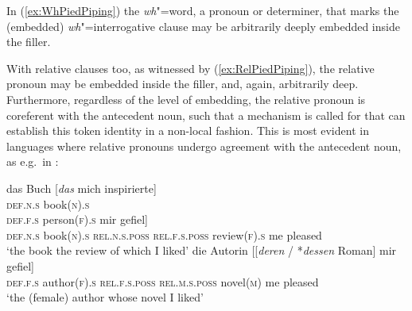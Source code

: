 \documentclass[output=paper
,notxmath 
	        ,collection
	        ,collectionchapter
 	        ,biblatex
                ,babelshorthands
                ,newtxmath
                ,draftmode
                ,colorlinks, citecolor=brown
]{langscibook}
\begin{document}
\begin{exe}
  \ex \label{ex:WhPiedPiping}
  \begin{xlist}
  \end{xlist}
\end{exe}

\begin{exe}
  \ex \label{ex:RelPiedPiping}
  \begin{xlist}
  \end{xlist}
\end{exe}

\noindent
In (\ref{ex:WhPiedPiping}) the \emph{wh}"=word, a pronoun or determiner, that
marks the (embedded) \emph{wh}"=interrogative clause may be arbitrarily deeply embedded inside the filler.  

With relative clauses too, as witnessed by (\ref{ex:RelPiedPiping}), the
relative pronoun may be embedded inside the filler, and, again,
arbitrarily deep. Furthermore, regardless of the level of embedding,
the relative pronoun is coreferent with the antecedent noun, such that
a mechanism is called for that can establish this token identity in a
non-local fashion. This is most evident in languages where relative
pronouns undergo agreement with the antecedent noun, as e.g.\ in
:

\eal
\ex
\gll das Buch [\textit{das} mich inspirierte]\\
     \textsc{def.n.s} book(\textsc{n})\textsc{.s} \hphantom[\textsc{rel.n.s} me inspired\\
\glt `the book that inspired me'
\ex
\gll die Person [\textit{die} mich inspirierte]\\
     \textsc{def.f.s} person(\textsc{f})\textsc{.s} \hphantom[\textsc{rel.f.s} me inspired\\   
\glt `the person that inspired me'
\ex
\gll das Buch [[\textit{dessen} / *\textit{deren} Rezension] mir gefiel]\\
     \textsc{def.n.s} book(\textsc{n})\textsc{.s} \hphantom{[[}\textsc{rel.n.s.poss} {} \hphantom{*}\textsc{rel.f.s.poss} review(\textsc{f}).\textsc{s} me pleased\\
\glt `the book the review of which I liked'
\ex
\gll die Autorin [[\textit{deren} / *\textit{dessen} Roman] mir gefiel]\\
     \textsc{def.f.s} author(\textsc{f})\textsc{.s} \hphantom{[[}\textsc{rel.f.s.poss} {} \hphantom{*}\textsc{rel.m.s.poss} novel(\textsc{m}) me pleased\\
\glt `the (female) author whose novel I liked'
\zl
\end{document}
